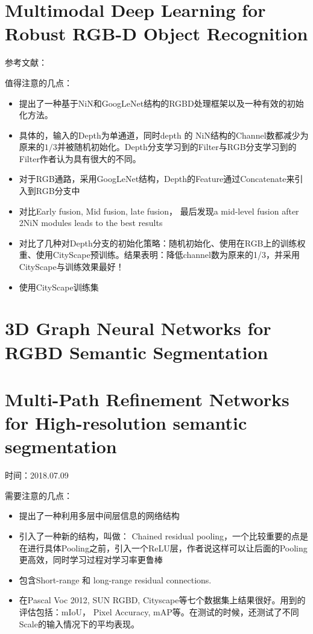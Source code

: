 \section{Multimodal Deep Learning for Robust RGB-D Object Recognition}

参考文献：\cite{eitel2015multimodal}

值得注意的几点：

\begin{itemize}
\item 提出了一种基于NiN和GoogLeNet结构的RGBD处理框架以及一种有效的初始化方法。
\item 具体的，输入的Depth为单通道，同时depth 的 NiN结构的Channel数都减少为原来的$1/3$并被随机初始化。Depth分支学习到的Filter与RGB分支学习到的Filter作者认为具有很大的不同。
\item 对于RGB通路，采用GoogLeNet结构，Depth的Feature通过Concatenate来引入到RGB分支中
\item 对比Early fusion, Mid fusion, late fusion， 最后发现a mid-level fusion after 2NiN modules leads to the best results
\item 对比了几种对Depth分支的初始化策略：随机初始化、使用在RGB上的训练权重、使用CityScape预训练。结果表明：降低channel数为原来的1/3，并采用CityScape与训练效果最好！
\item 使用CityScape训练集
\end{itemize}

\section{3D Graph Neural Networks for RGBD Semantic Segmentation}


\section[RefineNet]{Multi-Path Refinement Networks for High-resolution semantic segmentation}

时间：2018.07.09

需要注意的几点：
\begin{itemize}
\item 提出了一种利用多层中间层信息的网络结构
\item 引入了一种新的结构，叫做： Chained residual pooling，一个比较重要的点是在进行具体Pooling之前，引入一个ReLU层，作者说这样可以让后面的Pooling更高效，同时学习过程对学习率更鲁棒
\item 包含Short-range 和 long-range residual connections. 
\item 在Pascal Voc 2012, SUN RGBD, Cityscape等七个数据集上结果很好。用到的评估包括：mIoU， Pixel Accuracy, mAP等。在测试的时候，还测试了不同Scale的输入情况下的平均表现。
\end{itemize}
                                                                                

